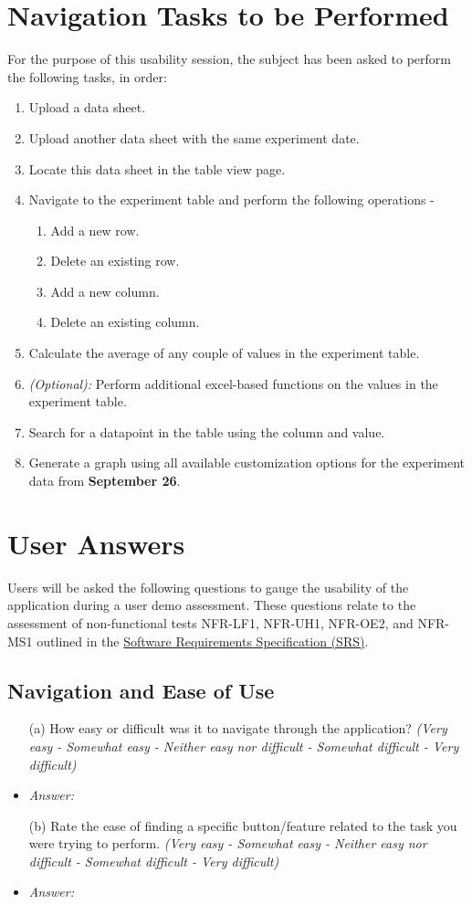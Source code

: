 \documentclass{article}
\begin{document}
\section{Navigation Tasks to be Performed}
For the purpose of this usability session, the subject has been asked to perform the following tasks, in order:
\begin{enumerate}
  \item Upload a data sheet.
  \item Upload another data sheet with the same experiment date.
  \item Locate this data sheet in the table view page.
  \item Navigate to the experiment table and perform the following operations -
  \begin{enumerate}
    \item Add a new row.
    \item Delete an existing row.
    \item Add a new column.
    \item Delete an existing column.
  \end{enumerate}
  \item Calculate the average of any couple of values in the experiment table.
  \item \emph{(Optional):} Perform additional excel-based functions on the values in the experiment table.
  \item Search for a datapoint in the table using the column and value.
  \item Generate a graph using all available customization options for the experiment data from \textbf{September 26}.
\end{enumerate}
\section{User Answers}

Users will be asked the following questions to gauge the usability of the
application during a user demo assessment. These questions relate to
the assessment of non-functional tests NFR-LF1, NFR-UH1, NFR-OE2, and NFR-MS1 outlined in the 
\href{https://github.com/SumanyaG/Alkalytics/blob/main/docs/SRS/SRS.pdf}{Software Requirements Specification (SRS)}.

\subsection*{\textbf{Navigation and Ease of Use}}
  \begin{itemize}
    \item[(a)] How easy or difficult was it to navigate through the
    application? \textit{(Very easy - Somewhat easy - Neither easy nor difficult
    - Somewhat difficult - Very difficult)}
    \item \emph{Answer:}
    \item[(b)] Rate the ease of finding a specific button/feature related to the
    task you were trying to perform. \textit{(Very easy - Somewhat easy -
    Neither easy nor difficult - Somewhat difficult - Very difficult)}
    \item \emph{Answer:}
  \end{itemize}
\end{document}
